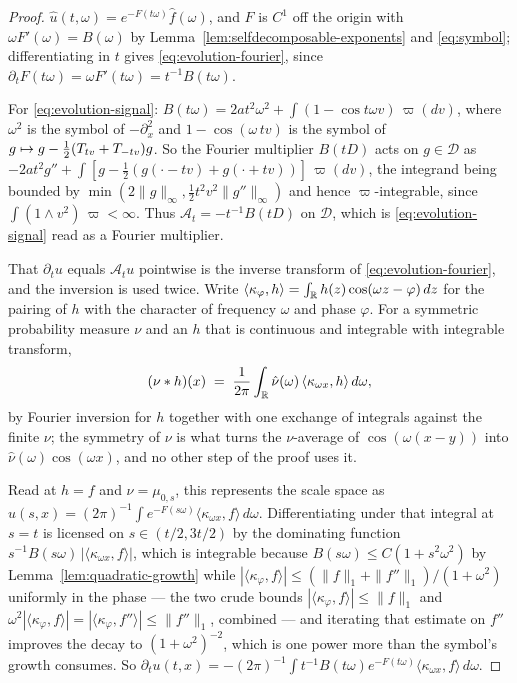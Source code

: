 \begin{proof}
$\hat u(t,\omega) = e^{-F(t\omega)}\hat f(\omega)$, and $F$ is $C^1$ off the origin with
$\omega F'(\omega) = B(\omega)$ by Lemma~\ref{lem:selfdecomposable-exponents} and
\ref{eq:symbol}; differentiating in $t$ gives \ref{eq:evolution-fourier}, since
$\partial_t F(t\omega) = \omega F'(t\omega) = t^{-1}B(t\omega)$.

For \ref{eq:evolution-signal}: $B(t\omega) = 2at^2\omega^2 + \int(1 - \cos t\omega
v)\,\varpi(dv)$, where $\omega^2$ is the symbol of $-\partial_x^2$ and $1 - \cos(\omega\,tv)$
is the symbol of $g \mapsto g - \tfrac12(T_{tv} + T_{-tv})g$. So the Fourier multiplier
$B(tD)$ acts on $g \in \mathcal{D}$ as
$-2at^2g'' + \int[g - \tfrac12(g(\cdot - tv) + g(\cdot + tv))]\,\varpi(dv)$, the integrand
being bounded by $\min(2\|g\|_\infty, \tfrac12t^2v^2\|g''\|_\infty)$ and hence
$\varpi$-integrable, since $\int (1 \wedge v^2)\,\varpi < \infty$. Thus
$\mathcal{A}_t = -t^{-1}B(tD)$ on $\mathcal{D}$, which is \ref{eq:evolution-signal} read as a
Fourier multiplier.

That $\partial_t u$ equals $\mathcal{A}_tu$ pointwise is the inverse transform of
\ref{eq:evolution-fourier}, and the inversion is used twice. Write
$\langle\kappa_\varphi, h\rangle = \int_{\mathbb{R}} h(z)\cos(\omega z - \varphi)\,dz$ for the pairing of
$h$ with the character of frequency $\omega$ and phase $\varphi$. For a symmetric probability
measure $\nu$ and an $h$ that is continuous and integrable with integrable transform,
\[
  (\nu * h)(x) \;=\; \frac{1}{2\pi}\int_{\mathbb{R}} \hat\nu(\omega)\,
    \langle\kappa_{\omega x}, h\rangle\,d\omega ,
\]
by Fourier inversion for $h$ together with one exchange of integrals against the finite $\nu$;
the symmetry of $\nu$ is what turns the $\nu$-average of $\cos(\omega(x-y))$ into
$\hat\nu(\omega)\cos(\omega x)$, and no other step of the proof uses it.

Read at $h = f$ and $\nu = \mu_{0,s}$, this represents the scale space as
$u(s,x) = (2\pi)^{-1}\int e^{-F(s\omega)}\langle\kappa_{\omega x},f\rangle\,d\omega$.
Differentiating under that integral at $s = t$ is licensed on $s \in (t/2, 3t/2)$ by the
dominating function $s^{-1}B(s\omega)\,|\langle\kappa_{\omega x},f\rangle|$, which is integrable
because $B(s\omega) \le C(1 + s^2\omega^2)$ by Lemma~\ref{lem:quadratic-growth} while
$|\langle\kappa_\varphi, f\rangle| \le (\|f\|_1 + \|f''\|_1)/(1 + \omega^2)$ uniformly in the
phase --- the two crude bounds $|\langle\kappa_\varphi,f\rangle| \le \|f\|_1$ and
$\omega^2|\langle\kappa_\varphi,f\rangle| = |\langle\kappa_\varphi,f''\rangle| \le \|f''\|_1$,
combined --- and iterating that estimate on $f''$ improves the decay to
$(1 + \omega^2)^{-2}$, which is one power more than the symbol's growth consumes. So
$\partial_tu(t,x)
 = -(2\pi)^{-1}\int t^{-1}B(t\omega)e^{-F(t\omega)}\langle\kappa_{\omega x},f\rangle\,d\omega$.


\end{proof}
